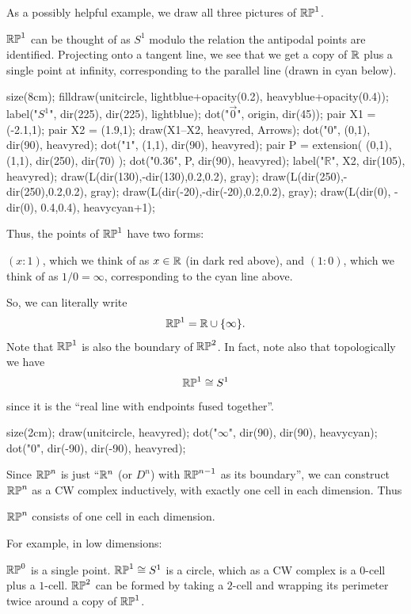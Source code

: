 As a possibly helpful example, we draw all three pictures of $\mathbb{RP}^1$.
\begin{example}
	$\mathbb{RP}^1$ can be thought of as $S^1$ modulo the relation
	the antipodal points are identified.
	Projecting onto a tangent line, we see that we get
	a copy of $\mathbb R$ plus a single point at infinity, corresponding
	to the parallel line (drawn in cyan below).
	\begin{center}
		\begin{asy}
			size(8cm);
			filldraw(unitcircle, lightblue+opacity(0.2), heavyblue+opacity(0.4));
			label("$S^1$", dir(225), dir(225), lightblue);
			dot("$\vec 0$", origin, dir(45));
			pair X1 = (-2.1,1);
			pair X2 = (1.9,1);
			draw(X1--X2, heavyred, Arrows);
			dot("$0$", (0,1), dir(90), heavyred);
			dot("$1$", (1,1), dir(90), heavyred);
			pair P = extension( (0,1), (1,1), dir(250), dir(70) );
			dot("$0.36$", P, dir(90), heavyred);
			label("$\mathbb R$", X2, dir(105), heavyred);
			draw(L(dir(130),-dir(130),0.2,0.2), gray);
			draw(L(dir(250),-dir(250),0.2,0.2), gray);
			draw(L(dir(-20),-dir(-20),0.2,0.2), gray);
			draw(L(dir(0), -dir(0), 0.4,0.4), heavycyan+1);
		\end{asy}
	\end{center}
	Thus, the points of $\mathbb{RP}^1$ have two forms:
	\begin{itemize}
		\ii $(x:1)$, which we think of as $x \in \mathbb R$ (in dark red above), and
		\ii $(1:0)$, which we think of as $1/0 = \infty$,
		corresponding to the cyan line above.
	\end{itemize}
	So, we can literally write
	\[ \mathbb{RP}^1 = \mathbb R \cup \{\infty\}. \]
	Note that $\mathbb{RP}^1$ is also the boundary of $\mathbb{RP}^2$.
	In fact, note also that topologically we have
	\[ \mathbb{RP}^1 \cong S^1 \]
	since it is the ``real line with endpoints fused together''.
	\begin{center}
		\begin{asy}
			size(2cm);
			draw(unitcircle, heavyred);
			dot("$\infty$", dir(90), dir(90), heavycyan);
			dot("$0$", dir(-90), dir(-90), heavyred);
		\end{asy}
	\end{center}
\end{example}

Since $\mathbb{RP}^n$ is just ``$\mathbb R^n$ (or $D^n$) with $\mathbb{RP}^{n-1}$ as its boundary'',
we can construct $\mathbb{RP}^n$ as a CW complex inductively,
with exactly one cell in each dimension.
Thus
\begin{moral}
	$\mathbb{RP}^n$ consists of one cell in each dimension.
\end{moral}
For example, in low dimensions:
\begin{example}
	\listhack
	\begin{enumerate}[(a)]
		\ii $\mathbb{RP}^0$ is a single point.
		\ii $\mathbb{RP}^1 \cong S^1$ is a circle, which as a CW complex
		is a $0$-cell plus a $1$-cell.
		\ii $\mathbb{RP}^2$ can be formed by taking a $2$-cell
		and wrapping its perimeter twice around a copy of $\mathbb{RP}^1$.
	\end{enumerate}
\end{example}

